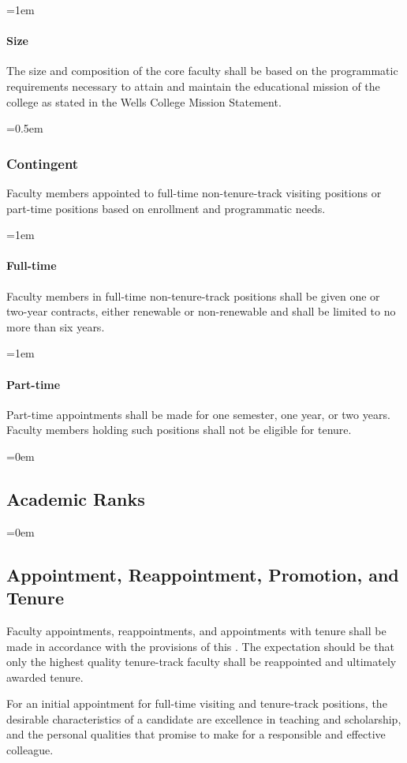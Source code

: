 \documentclass{manual}
\let\oldsubsection\subsection
\renewcommand\subsection{\leftskip=0em\oldsubsection}
\let\oldsubsubsection\subsubsection
\renewcommand\subsubsection{\leftskip=0.5em\oldsubsubsection}
\let\oldparagraph\paragraph
\renewcommand\paragraph{\leftskip=1em\oldparagraph}
\begin{document}
\paragraph{Size} 
The size and composition of the core faculty shall be based on the programmatic requirements necessary to attain and maintain the educational mission of the college as stated in the Wells College Mission Statement.

\subsubsection{Contingent}
Faculty members appointed to full-time non-tenure-track visiting positions or part-time positions based on enrollment and programmatic needs.

\paragraph{Full-time} 
Faculty members in full-time non-tenure-track positions shall be given one or two-year contracts, either renewable or non-renewable and shall be limited to no more than six years.

\paragraph{Part-time} 
Part-time appointments shall be made for one semester, one year, or two years. Faculty members holding such positions shall not be eligible for tenure.

\subsection{Academic Ranks}


\subsection{Appointment, Reappointment, Promotion, and Tenure}\label{sec:AppointmentReappointmentPromotionAndTenure}
Faculty appointments, reappointments, and appointments with tenure shall be made in accordance with the provisions of this . The expectation should be that only the highest quality tenure-track faculty shall be reappointed and ultimately awarded tenure.

For an initial appointment for full-time visiting and tenure-track positions, the desirable characteristics of a candidate are excellence in teaching and scholarship, and the personal qualities that promise to make for a responsible and effective colleague.
\end{document}
